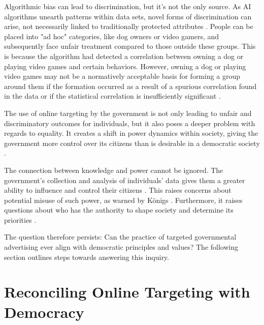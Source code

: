 \documentclass[preprint]{acmart}
\begin{document}

Algorithmic bias can lead to discrimination, but it's not the only source. As AI algorithms unearth patterns within data sets, novel forms of discrimination can arise, not necessarily linked to traditionally protected attributes \cite{wachter2021}. People can be placed into "ad hoc" categories, like dog owners or video gamers, and subsequently face unfair treatment compared to those outside these groups. This is because the algorithm had detected a correlation between owning a dog or playing video games and certain behaviors. However, owning a dog or playing video games may not be a normatively acceptable basis for forming a group around them if the formation occurred as a result of a spurious correlation found in the data or if the statistical correlation is insufficiently significant \cite{wachter2021}.



The use of online targeting by the government is not only leading to unfair and discriminatory outcomes for individuals, but it also poses a deeper problem with regards to equality. It creates a shift in power dynamics within society, giving the government more control over its citizens than is desirable in a democratic society \cite{zuboff2015big}.

The connection between knowledge and power cannot be ignored. The government's collection and analysis of individuals' data gives them a greater ability to influence and control their citizens \cite{veliz2020}. This raises concerns about potential misuse of such power, as warned by Königs \cite{konigs2022}. Furthermore, it raises questions about who has the authority to shape society and determine its priorities \cite{Collier2022}.



The question therefore persists: Can the practice of targeted governmental advertising ever align with democratic principles and values? The following section outlines steps towards answering this inquiry.



\section{Reconciling Online Targeting with Democracy }
\end{document}
